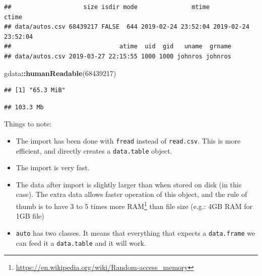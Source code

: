 \documentclass[]{book}
\newenvironment{Shaded}{\begin{snugshade}}{\end{snugshade}}
\newcommand{\CommentTok}[1]{\textcolor[rgb]{0.56,0.35,0.01}{\textit{#1}}}
\newcommand{\DataTypeTok}[1]{\textcolor[rgb]{0.13,0.29,0.53}{#1}}
\newcommand{\DecValTok}[1]{\textcolor[rgb]{0.00,0.00,0.81}{#1}}
\newcommand{\KeywordTok}[1]{\textcolor[rgb]{0.13,0.29,0.53}{\textbf{#1}}}
\newcommand{\NormalTok}[1]{#1}
\newcommand{\OperatorTok}[1]{\textcolor[rgb]{0.81,0.36,0.00}{\textbf{#1}}}
\newcommand{\StringTok}[1]{\textcolor[rgb]{0.31,0.60,0.02}{#1}}
\providecommand{\tightlist}{%
  \setlength{\itemsep}{0pt}\setlength{\parskip}{0pt}}
\renewcommand{\href}[2]{#2\footnote{\url{#1}}}
\theoremstyle{definition}
\theoremstyle{definition}
\theoremstyle{definition}
\theoremstyle{remark}
\begin{document}
\begin{verbatim}
##                    size isdir mode               mtime               ctime
## data/autos.csv 68439217 FALSE  644 2019-02-24 23:52:04 2019-02-24 23:52:04
##                              atime  uid  gid   uname  grname
## data/autos.csv 2019-03-27 22:15:55 1000 1000 johnros johnros
\end{verbatim}

\begin{Shaded}
\begin{Highlighting}[]
\NormalTok{gdata}\OperatorTok{::}\KeywordTok{humanReadable}\NormalTok{(}\DecValTok{68439217}\NormalTok{)}
\end{Highlighting}
\end{Shaded}

\begin{verbatim}
## [1] "65.3 MiB"
\end{verbatim}

\begin{Shaded}
\end{Shaded}

\begin{verbatim}
## 103.3 Mb
\end{verbatim}

Things to note:

\begin{itemize}
\tightlist
\item
  The import has been done with \texttt{fread} instead of \texttt{read.csv}. This is more efficient, and directly creates a \texttt{data.table} object.
\item
  The import is very fast.
\item
  The data after import is slightly larger than when stored on disk (in this case). The extra data allows faster operation of this object, and the rule of thumb is to have 3 to 5 times more \href{https://en.wikipedia.org/wiki/Random-access_memory}{RAM} than file size (e.g.: 4GB RAM for 1GB file)
\item
  \texttt{auto} has two classes. It means that everything that expects a \texttt{data.frame} we can feed it a \texttt{data.table} and it will work.
\end{itemize}
\end{document}
